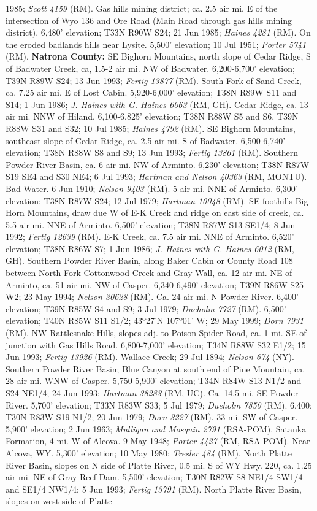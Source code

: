 1985; \textit{Scott 4159} (RM).  Gas hills mining district; ca. 2.5 air mi. E of the intersection of Wyo 136 and Ore Road (Main Road through gas hills mining district). 6,480' elevation; T33N R90W S24; 21 Jun 1985; \textit{Haines 4281} (RM).  On the eroded badlands hills near Lysite. 5,500' elevation; 10 Jul 1951; \textit{Porter 5741} (RM).  \textbf{Natrona County:} SE Bighorn Mountains, north slope of Cedar Ridge, S of Badwater Creek, ca, 1.5-2 air mi. NW of Badwater. 6,200-6,700’ elevation; T39N R89W S24; 13 Jun 1993; \textit{Fertig 13877} (RM).  South Fork of Sand Creek, ca. 7.25 air mi. E of Lost Cabin. 5,920-6,000’ elevation; T38N R89W S11 and S14; 1 Jun 1986; \textit{J. Haines with G. Haines 6063} (RM, GH).  Cedar Ridge, ca. 13 air mi. NNW of Hiland. 6,100-6,825’ elevation; T38N R88W S5 and S6, T39N R88W S31 and S32; 10 Jul 1985; \textit{Haines 4792} (RM). SE Bighorn Mountains, southeast slope of Cedar Ridge, ca. 2.5 air mi. S of Badwater. 6,500-6,740’ elevation; T38N R88W S8 and S9; 13 Jun 1993; \textit{Fertig 13861} (RM).  Southern Powder River Basin, ca. 6 air mi. NW of Arminto. 6,230’ elevation; T38N R87W S19 SE4 and S30 NE4; 6 Jul 1993; \textit{Hartman and Nelson 40363} (RM, MONTU).  Bad Water. 6 Jun 1910; \textit{Nelson 9403} (RM).  5 air mi. NNE of Arminto. 6,300’ elevation; T38N R87W S24; 12 Jul 1979; \textit{Hartman 10048} (RM).  SE foothills Big Horn Mountains, draw due W of E-K Creek and ridge on east side of creek, ca. 5.5 air mi. NNE of Arminto. 6,500’ elevation; T38N R87W S13 SE1/4; 8 Jun 1992; \textit{Fertig 12639} (RM).  E-K Creek, ca. 7.5 air mi. NNE of Arminto. 6,520’ elevation; T38N R86W S7; 1 Jun 1986; \textit{J. Haines with G. Haines 6012} (RM, GH).  Southern Powder River Basin, along Baker Cabin or County Road 108 between North Fork Cottonwood Creek and Gray Wall, ca. 12 air mi. NE of Arminto, ca. 51 air mi. NW of Casper. 6,340-6,490’ elevation; T39N R86W S25 W2; 23 May 1994; \textit{Nelson 30628} (RM).  Ca. 24 air mi. N Powder River. 6,400’ elevation; T39N R85W S4 and S9; 3 Jul 1979; \textit{Dueholm 7727} (RM).  6,500' elevation; T40N R85W S11 S1/2;	43º27'N 107º01' W; 29 May 1999; \textit{Dorn 7931} (RM).  NW Rattlesnake Hills, slopes adj. to Poison Spider Road, ca. 1 mi. SE of junction with Gas Hills Road. 6,800-7,000’ elevation; T34N R88W S32 E1/2; 15 Jun 1993; \textit{Fertig 13926} (RM).  Wallace Creek; 29 Jul 1894; \textit{Nelson 674} (NY).  Southern Powder River Basin; Blue Canyon at south end of Pine Mountain, ca. 28 air mi. WNW of Casper.	5,750-5,900' elevation; T34N R84W S13	N1/2 and S24 NE1/4; 24 Jun 1993; \textit{Hartman 38283} (RM, UC).  Ca. 14.5 mi. SE Powder River. 5,700’ elevation; T33N R83W S33; 5 Jul 1979; \textit{Dueholm 7850} (RM). 6,400; T30N R83W S19 N1/2; 20 Jun 1979; \textit{Dorn 3227} (RM).  33 mi. SW of Casper. 5,900’ elevation; 2 Jun 1963; \textit{Mulligan and Mosquin 2791} (RSA-POM).  Satanka Formation, 4 mi. W of Alcova. 9 May 1948; \textit{Porter 4427} (RM, RSA-POM).  Near Alcova, WY.  5,300’ elevation; 10 May 1980; \textit{Tresler 484} (RM).  North Platte River Basin, slopes on N side of Platte River, 0.5 mi. S of WY Hwy. 220, ca. 1.25 air mi. NE of Gray Reef Dam. 5,500’ elevation; T30N R82W S8 NE1/4 SW1/4 and SE1/4 NW1/4; 5 Jun 1993; \textit{Fertig 13791} (RM).  North Platte River Basin, slopes on west side of Platte 